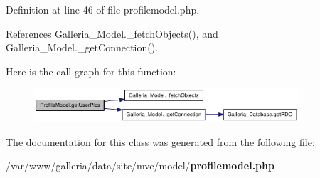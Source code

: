 Definition at line 46 of file profilemodel.php.

References Galleria\_\-Model.\_\-fetchObjects(), and Galleria\_\-Model.\_\-getConnection().

Here is the call graph for this function:\nopagebreak
\begin{figure}[H]
\begin{center}
\leavevmode
\includegraphics[width=279pt]{classProfileModel_209e4ead16fd0966ae0232b2e1a7b99d_cgraph}
\end{center}
\end{figure}


The documentation for this class was generated from the following file:\begin{CompactItemize}
\item 
/var/www/galleria/data/site/mvc/model/{\bf profilemodel.php}\end{CompactItemize}
